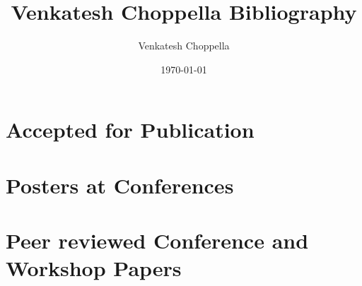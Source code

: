 \documentclass[11pt]{article}
\author{Venkatesh Choppella}
\date{\today}
\title{Venkatesh Choppella Bibliography}
\begin{document}
\maketitle
\tableofcontents




\section{Accepted for Publication}
\begin{refsection}[accepted]
\nocite{*}
\printbibliography[keyword={accepted}, title={}
]
\end{refsection}


\section{Posters at Conferences}
\begin{refsection}[posters]
\nocite{*}
\printbibliography[keyword={poster}, title={}
]
\end{refsection}

\section{Peer reviewed  Conference and Workshop Papers}
\begin{refsection}
\nocite{*}
\printbibliography[keyword={conf-paper}, title={}
]
\end{refsection}
\end{document}

